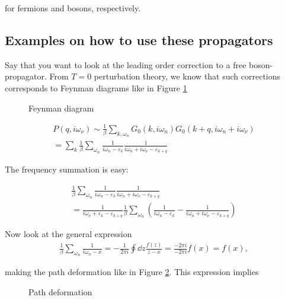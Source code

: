 for fermions and bosons, respectively. 

\subsection{Examples on how to use these propagators}

Say that you want to look at the leading order correction to a free boson-propagator. From $T = 0$ perturbation theory, we know that such corrections corresponds to Feynman diagrams like in Figure \ref{fig:feyn_diag} \\ 


\begin{figure}
	\centering
	
	\caption{Feynman diagram}
	\label{fig:feyn_diag}
\end{figure}


\begin{align*}
    P(q, i\omega_\nu) \sim \frac{1}{\beta}\sum_{k, \omega_n}G_0(k, i\omega_n)G_0(k+q, i\omega_n + i\omega_\nu) \\ = \sum_{k} \frac{1}{\beta} \sum_{\omega_n} \frac{1}{i\omega_n - \varepsilon_k}\frac{1}{i\omega_n + i\omega_\nu - \varepsilon_{k+q}}
\end{align*}

The frequency summation is easy: 

\begin{align*}
    \frac{1}{\beta} \sum_{\omega_n} \frac{1}{i\omega_n - \varepsilon_k}\frac{1}{i\omega_n + i\omega_\nu - \varepsilon_{k+q}} \\ = \frac{1}{i\omega_\nu + \varepsilon_k - \varepsilon_{k+q}} \frac{1}{\beta}\sum_{\omega_n}\left(\frac{1}{i\omega_n - \varepsilon_k} - \frac{1}{i\omega_n + i\omega_\nu - \varepsilon_{k+q}} \right)
\end{align*}


Now look at the general expression
\begin{align*}
    \frac{1}{\beta}\sum_{\omega_n} \frac{1}{i\omega_n - x} = -\frac{1}{2\pi i}\oint \dd z \frac{f(z)}{z - x} = \frac{-2\pi i}{-2\pi i} f(x) = f(x),
\end{align*}

making the path deformation like in Figure \ref{fig:poles}. This expression implies

\begin{figure}
	\centering
	
	\caption{Path deformation}
	\label{fig:poles}
\end{figure}


